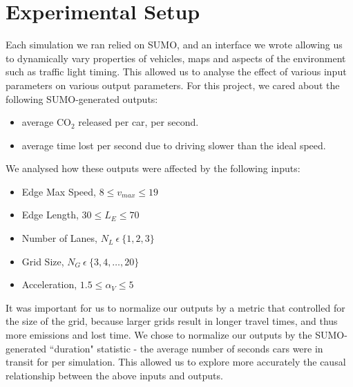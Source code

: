 \documentclass{article}
\newcommand{\harry}[1]{\sethlcolor{green}\hl{[Harry: #1]}}
\newcommand{\harry}[1]{}
\begin{document}
\section{Experimental Setup}
\label{sec:exp-setup}

Each simulation we ran relied on SUMO, and an interface we wrote allowing us to dynamically vary properties of vehicles, maps and aspects of the environment such as traffic light timing. This allowed us to analyse the effect of various input parameters on various output parameters. For this project, we cared about the following SUMO-generated outputs:

\begin{itemize}
    \setlength\itemsep{0.05em}
    \item average CO$_2$ released per car, per second.
    \item average time lost per second due to driving slower than the ideal speed.
\end{itemize}

We analysed how these outputs were affected by the following inputs:

\begin{itemize}
    \setlength\itemsep{0.05em}
    \item Edge Max Speed, $ 8 \le v_{max} \le 19$ %
    \item Edge Length, $30 \le L_E \le 70$ %
    \item Number of Lanes, $N_L~\epsilon~\{1, 2, 3\}$ %
    \item Grid Size, $N_G~\epsilon~\{3, 4, \dots, 20\}$ %
    \item Acceleration, $1.5 \le \alpha_V \le 5$ %
\end{itemize}

It was important for us to normalize our outputs by a metric that controlled for the size of the grid, because larger grids result in longer travel times, and thus more emissions and lost time. We chose to normalize our outputs by the SUMO-generated ``duration" statistic - the average number of seconds cars were in transit for per simulation. This allowed us to explore more accurately the causal relationship between the above inputs and outputs.
\end{document}
